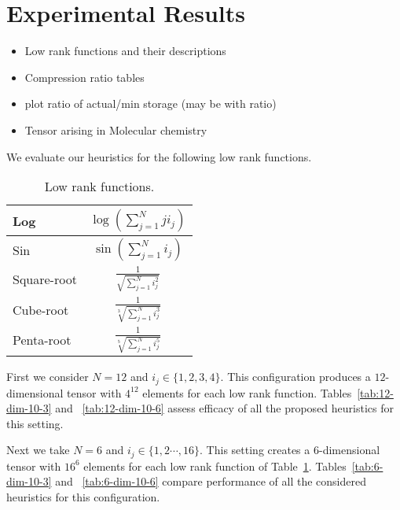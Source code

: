 \documentclass[runningheads]{llncs}
\begin{document}

\section{Experimental Results}
\label{sec:expResults}
\begin{itemize}
	\item Low rank functions and their descriptions
	\item Compression ratio tables
	\item plot ratio of actual/min storage (may be with ratio)
	\item Tensor arising in Molecular chemistry
\end{itemize}


\noindent We evaluate our heuristics for the following low rank functions.
\begin{table}[htb]
	\centering
	\begin{tabular}{|l|c|}
		\hline
		Log & $\log(\sum_{j=1}^{N}j i_j)$\\ \hline
		Sin & $\sin(\sum_{j=1}^{N}i_j)$\\ \hline
		Square-root & $\frac{1}{\sqrt{\sum_{j=1}^{N}i_j^2}}$\\ \hline
		Cube-root & $\frac{1}{\sqrt[3]{\sum_{j=1}^{N}i_j^3}}$\\ \hline
		Penta-root& $\frac{1}{\sqrt[5]{\sum_{j=1}^{N}i_j^5}}$\\ \hline
	\end{tabular}
	\caption{Low rank functions.\label{tab:lowRankFunctions}}
\end{table}

\noindent First we consider $N=12$ and $i_j \in \{1, 2, 3, 4\}$. This configuration produces a $12$-dimensional tensor with $4^{12}$ elements for each low rank function. Tables~\ref{tab:12-dim-10-3} and ~\ref{tab:12-dim-10-6} assess efficacy of all the proposed heuristics  for this setting.

Next we take $N=6$ and $i_j \in \{1,2 \cdots ,16\}$. This setting creates a $6$-dimensional tensor with $16^6$ elements for each low rank function of Table~\ref{tab:lowRankFunctions}. Tables~\ref{tab:6-dim-10-3} and ~\ref{tab:6-dim-10-6} compare performance of all the considered heuristics for this configuration.
\end{document}
